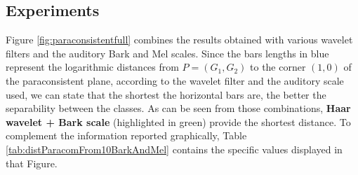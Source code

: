 	\subsection{Experiments}
		\par Figure \ref{fig:paraconsistentfull} combines the results obtained with various wavelet filters and the auditory Bark and Mel scales. Since the bars lengths in blue represent the logarithmic distances from $P=(G_1,G_2)$ to the corner $(1,0)$ of the paraconsistent plane, according to the wavelet filter and the auditory scale used, we can state that the shortest the horizontal bars are, the better the separability between the classes. As can be seen from those combinations, \textbf{Haar wavelet + Bark scale} (highlighted in green) provide the shortest distance. To complement the information reported graphically, Table \ref{tab:distParacomFrom10BarkAndMel} contains the specific values displayed in that Figure.
		\\

